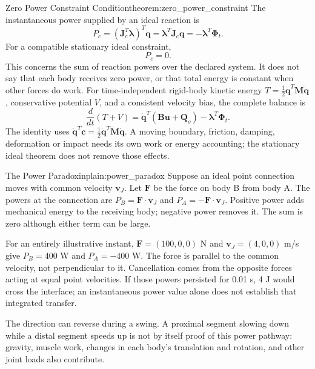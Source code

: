 \begin{theorem}{Zero Power Constraint Condition}{theorem:zero_power_constraint}
The instantaneous power supplied by an ideal reaction is
\begin{equation}
P_c=(\bm J_c^T\bm\lambda)^T\dot{\bm q}
=\bm\lambda^T\bm J_c\dot{\bm q}
=-\bm\lambda^T\bm\Phi_t.
\label{eq:constraint_power}
\end{equation}
For a compatible stationary ideal constraint,
\begin{equation}
P_c=0.
\label{eq:constraint_zero_power}
\end{equation}
This concerns the sum of reaction powers over the declared system. It does not say that each body receives zero power, or that total energy is constant when other forces do work. For time-independent rigid-body kinetic energy $T=\tfrac12\dot{\bm q}^T\bm M\dot{\bm q}$, conservative potential $V$, and a consistent velocity bias, the complete balance is
\[
\frac{d}{dt}(T+V)=\dot{\bm q}^T(\bm B\bm u+\bm Q_o)
-\bm\lambda^T\bm\Phi_t.
\]
The identity uses $\dot{\bm q}^T\bm c=\tfrac12\dot{\bm q}^T\dot{\bm M}\dot{\bm q}$. A moving boundary, friction, damping, deformation or impact needs its own work or energy accounting; the stationary ideal theorem does not remove those effects.
\end{theorem}

\begin{laymansbox}{The Power Paradox}{inplain:power_paradox}
Suppose an ideal point connection moves with common velocity $\bm v_J$. Let $\bm F$ be the force on body B from body A. The powers at the connection are $P_B=\bm F\cdot\bm v_J$ and $P_A=-\bm F\cdot\bm v_J$. Positive power adds mechanical energy to the receiving body; negative power removes it. The sum is zero although either term can be large.

For an entirely illustrative instant, $\bm F=(100,0,0)$ N and $\bm v_J=(4,0,0)$ m/s give $P_B=400$ W and $P_A=-400$ W. The force is parallel to the common velocity, not perpendicular to it. Cancellation comes from the opposite forces acting at equal point velocities. If those powers persisted for 0.01 s, 4 J would cross the interface; an instantaneous power value alone does not establish that integrated transfer.

The direction can reverse during a swing. A proximal segment slowing down while a distal segment speeds up is not by itself proof of this power pathway: gravity, muscle work, changes in each body's translation and rotation, and other joint loads also contribute.
\end{laymansbox}

